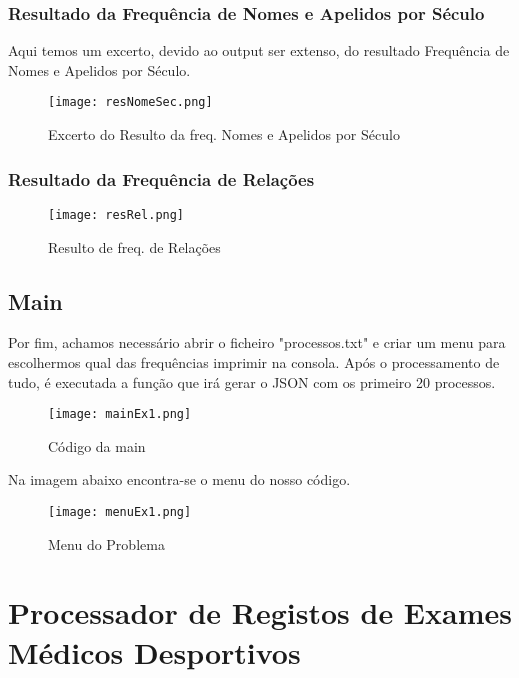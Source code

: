 \documentclass[11pt,a4paper]{report}%
\begin{document}
\subsection{Resultado da Frequência de Nomes e Apelidos por Século} \label{subsec:resNomeSec}

Aqui temos um excerto, devido ao output ser extenso, do resultado Frequência de Nomes e Apelidos por Século.

\begin{figure}[htbp]
\centerline{\texttt{[image: resNomeSec.png]}}
\caption{Excerto do Resulto da freq. Nomes e Apelidos por Século}
\label{fig}
\end{figure}


\newpage
\subsection{Resultado da Frequência de Relações} \label{subsec:resRel}


\begin{figure}[htbp]
\centerline{\texttt{[image: resRel.png]}}
\caption{Resulto de freq. de Relações}
\label{fig}
\end{figure}

\newpage

\section{Main} \label{sec:main1}

Por fim, achamos necessário abrir o ficheiro "processos.txt" e criar um menu para escolhermos qual das frequências imprimir na consola. Após o processamento de tudo, é executada a função que irá gerar o JSON com os primeiro 20 processos.

\begin{figure}[htbp]
\centerline{\texttt{[image: mainEx1.png]}}
\caption{Código da main}
\label{fig}
\end{figure}

Na imagem abaixo encontra-se o menu do nosso código.
\begin{figure}[htbp]
\centerline{\texttt{[image: menuEx1.png]}}
\caption{Menu do Problema}
\label{fig}
\end{figure}


\newpage
\chapter{ Processador de Registos de Exames Médicos Desportivos} \label{chap:ex2} %
\end{document}
